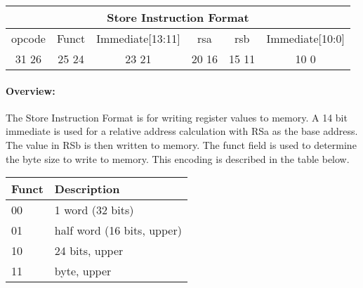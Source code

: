 \documentclass[letterpaper, 11pt]{article}
\begin{document}
\begin{center}
		\begin{tabular}{|c|c|c|c|c|c|}
			\multicolumn{6}{c}{Store Instruction Format}\\ \hline
				\hspace{2pt} opcode \hspace{2pt} & \hspace{5pt} Funct \hspace{5pt} &  \hspace{4pt} Immediate[13:11] \hspace{4pt} & \hspace{4pt}rsa  \hspace{4pt} & \hspace{4pt}rsb  \hspace{4pt} &\hspace{10pt}Immediate[10:0]  \hspace{10pt}     \\	\hline
				31 \hfill 26& 25 \hfill 24 &23 \hfill 21 &20 \hfill  16& 15 \hfill  11&10 \hfill  0\\ \hline
		
	\end{tabular}
\end{center}
\paragraph{Overview:}The Store Instruction Format is for writing register values to memory. A 14 bit immediate is used
for a relative address calculation with RSa as the base address. The value in RSb is then written to memory. The funct field is used
to determine the byte size to write to memory. This encoding is described in the table below. \\
\begin{tabular}{l|l}
		Funct & Description \\ \hline
		00	  & 1 word (32 bits) \\
		01	  & half word (16 bits, upper) \\ 
		10	  & 24 bits, upper \\
		11	  & byte, upper		\\
		\end{tabular}
\end{document}
